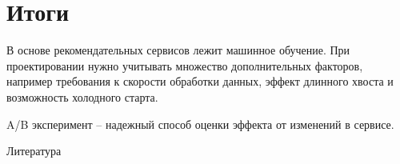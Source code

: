 \documentclass[11pt,aspectratio=169]{beamer}
\begin{document}
\section{Итоги}

\begin{frame}

\begin{tcolorbox}[colback=info!5,colframe=info!80]
В основе рекомендательных сервисов лежит машинное обучение. При проектировании  нужно учитывать множество дополнительных факторов, например требования к скорости обработки данных, эффект длинного хвоста и возможность холодного старта.
\end{tcolorbox}
\vfill
\begin{tcolorbox}[colback=info!5,colframe=info!80]
A/B эксперимент -- надежный способ оценки эффекта от изменений в сервисе.
\end{tcolorbox}

\end{frame}

\begin{frame}[allowframebreaks]{Литература}




\end{frame}
\end{document}
